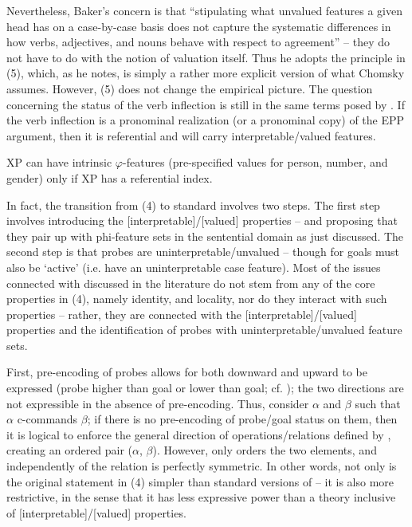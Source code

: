\documentclass[output=paper]{langsci/langscibook}
\begin{document}
Nevertheless, Baker’s concern is that “stipulating what unvalued features a given head has on a case-by-case basis does not capture the systematic differences in how verbs, adjectives, and nouns behave with respect to agreement” – they do not have to do with the notion of valuation itself. Thus he adopts the principle in (5), which, as he notes, is simply a rather more explicit version of what Chomsky assumes. However, (5) does not change the empirical picture. The question concerning the status of the verb inflection is still in the same terms posed by \citet{Manzini2007}. If the verb inflection is a pronominal realization (or a pronominal copy) of the EPP argument, then it is referential and will carry interpretable\slash valued features.

\ea%
    \label{ex:manzini:5}
    XP can have intrinsic $\varphi $-features (pre-specified values for person, number, and gender) only if XP has a referential index.
    \z

           

In fact, the transition from (4) to standard   involves two steps. The first step involves introducing the [interpretable]/[valued] properties – and proposing that they pair up with phi-feature sets in the sentential domain as just discussed. The second step is that probes are uninterpretable\slash unvalued – though for \citet{Chomsky2001Derivation} goals must also be ‘active’ (i.e. have an uninterpretable case feature). Most of the issues connected with  discussed in the  literature do not stem from any of the core properties in (4), namely identity,  and locality, nor do they interact with such properties – rather, they are connected with the [interpretable]/[valued] properties and the identification of probes with uninterpretable\slash {}unvalued feature sets. 

First, pre-encoding of probes allows for both downward and upward  to be expressed (probe higher than goal or lower than goal; cf. \citealt{Zeijlstra2012}); the two directions are not expressible in the absence of pre-encoding. Thus, consider $\alpha $ and $\beta $ such that $\alpha $ c-commands $\beta $; if there is no pre-encoding of probe\slash goal status on them, then it is logical to enforce the general direction of operations\slash relations defined by , creating an ordered pair ($\alpha $, $\beta $). However, only  orders the two elements, and independently of  the  relation is perfectly symmetric. In other words, not only is the original statement in (4) simpler than standard versions of  – it is also more restrictive, in the sense that it has less expressive power than a theory inclusive of [interpretable]/[valued] properties.
\end{document}

